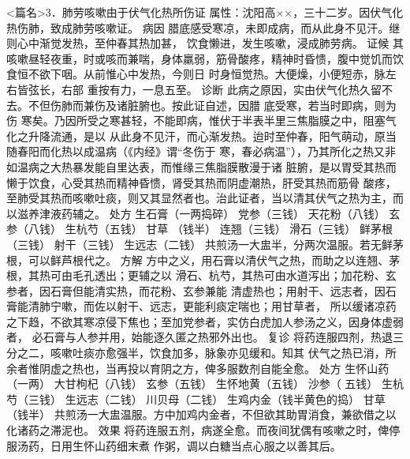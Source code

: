 \documentclass[a4paper,12pt,UTF8,twoside]{ctexbook}
\begin{document}
<篇名>3．肺劳咳嗽由于伏气化热所伤证
属性：沈阳高××，三十二岁。因伏气化热伤肺，致成肺劳咳嗽证。 
病因 腊底感受寒凉，未即成病，而从此身不见汗。继则心中渐觉发热，至仲春其热加甚， 
饮食懒进，发生咳嗽，浸成肺劳病。 
证候 其咳嗽昼轻夜重，时或咳而兼喘，身体羸弱，筋骨酸疼，精神时昏愦，腹中觉饥而饮 
食恒不欲下咽。从前惟心中发热，今则日 时身恒觉热。大便燥，小便短赤，脉左右皆弦长，右部 
重按有力，一息五至。 
诊断 此病之原因，实由伏气化热久留不去。不但伤肺而兼伤及诸脏腑也。按此证自述，因腊 
底受寒，若当时即病，则为伤 
寒矣。乃因所受之寒甚轻，不能即病，惟伏于半表半里三焦脂膜之中，阻塞气化之升降流通，是以 
从此身不见汗，而心渐发热。迨时至仲春，阳气萌动，原当随春阳而化热以成温病（《内经》谓“冬伤于 
寒，春必病温”），乃其所化之热又非如温病之大热暴发能自里达表，而惟缘三焦脂膜散漫于诸 
脏腑，是以胃受其热而懒于饮食，心受其热而精神昏愦，肾受其热而阴虚潮热，肝受其热而筋骨 
酸疼，至肺受其热而咳嗽吐痰，则又其显然者也。治此证者，当以清其伏气之热为主，而以滋养津液药辅之。 
处方 生石膏（一两捣碎） 党参（三钱） 天花粉（八钱） 玄参（八钱） 生杭芍（五钱） 甘草 
（钱半） 连翘（三钱） 滑石（三钱） 鲜茅根（三钱） 射干（三钱） 生远志（二钱） 
共煎汤一大盅半，分两次温服。若无鲜茅根，可以鲜芦根代之。 
方解 方中之义，用石膏以清伏气之热，而助之以连翘、茅根，其热可由毛孔透出；更辅之以 
滑石、杭芍，其热可由水道泻出；加花粉、玄参者，因石膏但能清实热，而花粉、玄参兼能 
清虚热也；用射干、远志者，因石膏能清肺宁嗽，而佐以射干、远志，更能利痰定喘也；用甘草者， 
所以缓诸凉药之下趋，不欲其寒凉侵下焦也；至加党参者，实仿白虎加人参汤之义，因身体虚弱者， 
必石膏与人参并用，始能逐久匿之热邪外出也。 
复诊 将药连服四剂，热退三分之二，咳嗽吐痰亦愈强半，饮食加多，脉象亦见缓和。知其 
伏气之热已消，所余者惟阴虚之热也，当再投以育阴之方，俾多服数剂自能全愈。 
处方 生怀山药（一两） 大甘枸杞（八钱） 玄参（五钱） 生怀地黄（五钱） 沙参（ 
五钱） 生杭芍（三钱） 生远志（二钱） 川贝母（二钱） 生鸡内金（钱半黄色的捣） 甘草（钱半） 
共煎汤一大盅温服。方中加鸡内金者，不但欲其助胃消食，兼欲借之以化诸药之滞泥也。 
效果 将药连服五剂，病遂全愈。而夜间犹偶有咳嗽之时，俾停服汤药，日用生怀山药细末煮 
作粥，调以白糖当点心服之以善其后。 
\end{document}
